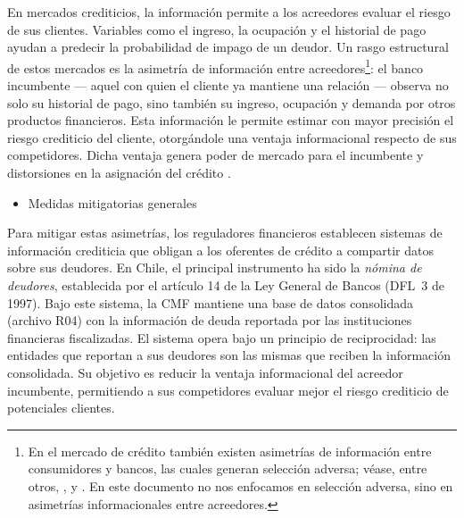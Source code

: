 \documentclass[11pt]{article}
\theoremstyle{plain}
\theoremstyle{plain}
\begin{document}
En mercados crediticios, la información permite a los acreedores evaluar el riesgo de sus clientes. Variables como el ingreso, la ocupación y el historial de pago ayudan a predecir la probabilidad de impago de un deudor. Un rasgo estructural de estos mercados es la asimetría de información entre acreedores\footnote{En el mercado de crédito también existen asimetrías de información entre consumidores y bancos, las cuales generan selección adversa; véase, entre otros, \textcite{rothschild_equilibrium_1976}, \textcite{einav_selection_2011} y \textcite{einav_io_2021}. En este documento no nos enfocamos en selección adversa, sino en asimetrías informacionales entre acreedores.}: el banco incumbente --- aquel con quien el cliente ya mantiene una relación --- observa no solo su historial de pago, sino también su ingreso, ocupación y demanda por otros productos financieros. Esta información le permite estimar con mayor precisión el riesgo crediticio del cliente, otorgándole una ventaja informacional respecto de sus competidores. Dicha ventaja genera poder de mercado para el incumbente y distorsiones en la asignación del crédito \parencite{sharpe_asymmetric_1990, dellariccia_information_2004}.


 
 

\begin{itemize}
    \item Medidas mitigatorias generales%
\end{itemize}
 
Para mitigar estas asimetrías, los reguladores financieros establecen sistemas de información crediticia que obligan a los oferentes de crédito a compartir datos sobre sus deudores. En Chile, el principal instrumento ha sido la \textit{nómina de deudores}, establecida por el artículo 14 de la Ley General de Bancos (DFL~3 de 1997). Bajo este sistema, la CMF mantiene una base de datos consolidada (archivo R04) con la información de deuda reportada por las instituciones financieras fiscalizadas. El sistema opera bajo un principio de reciprocidad: las entidades que reportan a sus deudores son las mismas que reciben la información consolidada. Su objetivo es reducir la ventaja informacional del acreedor incumbente, permitiendo a sus competidores evaluar mejor el riesgo crediticio de potenciales clientes.
\end{document}
